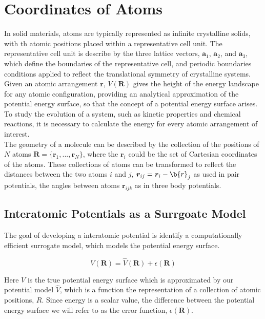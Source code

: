 \section{Coordinates of Atoms}


In solid materials, atoms are typically represented as infinite crystalline solids, with th atomic positions placed within a representative cell unit.  
The representative cell unit is describe by the three lattice vectors, 
	$\bm{a}_1$,
	$\bm{a}_2$,
and 
	$\bm{a}_3$, 
which define the boundaries of the representative cell, and periodic boundaries conditions applied to reflect the translational symmetry of crystalline systems.
\\
Given an atomic arrangement $\bm{r}$, $V(\bm{R})$ gives the height of the energy landscape for any atomic configuration, providing an analytical approximation of the potential energy surface, so that the concept of a potential energy surface arises.  
To study the evolution of a system, such as kinetic properties and chemical reactions, it is necessary to calculate the energy for every atomic arrangement of interest.
\\

The geometry of a molecule can be described by the collection of the positions of $N$ atoms 
	$\bm{R} = \{\bm{r}_1,...,\bm{r}_N\}$, 
	where the $\bm{r}_i$ could be the set of Cartesian coordinates of the atoms.  
These collections of atoms can be transformed to reflect the distances between the two atoms $i$ and $j$, 
	$\bm{r}_{ij}=\bm{r}_i - \b{r}_j$ as used in pair potentials, the angles between atoms $\bm{r}_{ijk}$ as in three body potentials.
\subsection{Interatomic Potentials as a Surrgoate Model}
The goal of developing a interatomic potential is identify a computationally efficient surrogate model, which models the potential energy surface.

\begin{equation}
  V(\bm{R}) = \hat{V}(\bm{R}) + \epsilon(\bm{R})
\end{equation}

Here $V$ is the true potential energy surface which is approximated by our potential model $\hat{V}$, which is a function the representation of a collection of atomic positions, $R$.  Since energy is a scalar value, the difference between the potential energy surface we will refer to as the error function, $\epsilon(\bm{R})$.



